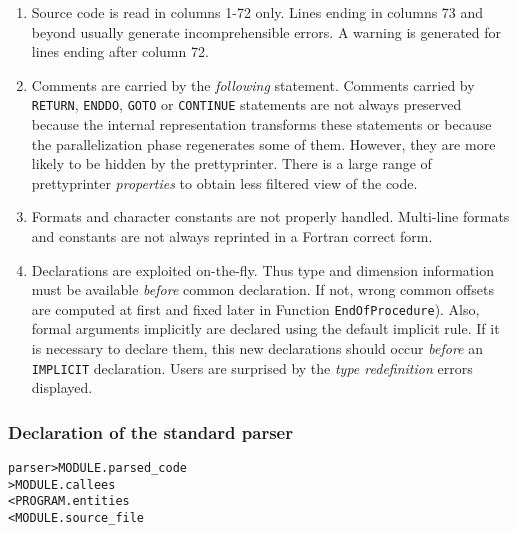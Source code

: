 \documentclass[a4paper]{report}
\newenvironment{PipsMake}{\begin{alltt}}{\end{alltt}}
\newcommand{\PROPERTIES}{{\em properties}}
\begin{document}
\begin{enumerate}

  \item Source code is read in columns 1-72 only. Lines ending in columns
73 and beyond usually generate incomprehensible errors. A warning is
generated for lines ending after column 72.

\item Comments are carried by the {\em following} statement. Comments
  carried by \texttt{RETURN}, \texttt{ENDDO}, \texttt{GOTO} or
  \texttt{CONTINUE} statements are not always preserved because the
  internal representation transforms these statements or because the
  parallelization phase regenerates some of them. However, they are
  more likely to be hidden by the prettyprinter.  There is a large
  range of prettyprinter \PROPERTIES{} to obtain less filtered view of
  the code.

\item Formats and character constants are not properly handled. Multi-line
  formats and constants are not always reprinted in a Fortran correct
  form.

\item Declarations are exploited on-the-fly. Thus type and dimension
  information must be available {\em before} common declaration. If not,
  wrong common offsets are computed at first and fixed
  later in Function \texttt{EndOfProcedure}). Also, formal arguments
  implicitly are declared using the default implicit rule. If it is
  necessary to declare them, this new declarations should occur {\em
    before} an \texttt{IMPLICIT} declaration. Users are surprised by the
  {\em type redefinition} errors displayed.


\end{enumerate}


\subsubsection{Declaration of the standard parser}
\label{subsubsection:declaration-of-the-standard-parser}

\begin{PipsMake}
parser                          > MODULE.parsed_code
                                > MODULE.callees
        < PROGRAM.entities
        < MODULE.source_file
\end{PipsMake}
\end{document}
